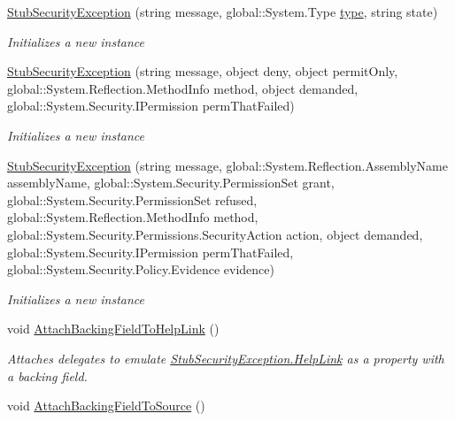 \begin{DoxyCompactItemize}
\hyperlink{class_system_1_1_security_1_1_fakes_1_1_stub_security_exception_a14219966c7775e4fcadc52aee919a311}{Stub\-Security\-Exception} (string message, global\-::\-System.\-Type \hyperlink{jquery-1_810_82-vsdoc_8js_a3940565e83a9bfd10d95ffd27536da91}{type}, string state)
\begin{DoxyCompactList}\small\item\em Initializes a new instance\end{DoxyCompactList}\item 
\hyperlink{class_system_1_1_security_1_1_fakes_1_1_stub_security_exception_adaeead1abee9dd06b0a7125549415ab9}{Stub\-Security\-Exception} (string message, object deny, object permit\-Only, global\-::\-System.\-Reflection.\-Method\-Info method, object demanded, global\-::\-System.\-Security.\-I\-Permission perm\-That\-Failed)
\begin{DoxyCompactList}\small\item\em Initializes a new instance\end{DoxyCompactList}\item 
\hyperlink{class_system_1_1_security_1_1_fakes_1_1_stub_security_exception_ab38e39877cafbd06cbf99647c3564cfc}{Stub\-Security\-Exception} (string message, global\-::\-System.\-Reflection.\-Assembly\-Name assembly\-Name, global\-::\-System.\-Security.\-Permission\-Set grant, global\-::\-System.\-Security.\-Permission\-Set refused, global\-::\-System.\-Reflection.\-Method\-Info method, global\-::\-System.\-Security.\-Permissions.\-Security\-Action action, object demanded, global\-::\-System.\-Security.\-I\-Permission perm\-That\-Failed, global\-::\-System.\-Security.\-Policy.\-Evidence evidence)
\begin{DoxyCompactList}\small\item\em Initializes a new instance\end{DoxyCompactList}\item 
void \hyperlink{class_system_1_1_security_1_1_fakes_1_1_stub_security_exception_ad994d840e66b4fa9ca30c504056e4ee1}{Attach\-Backing\-Field\-To\-Help\-Link} ()
\begin{DoxyCompactList}\small\item\em Attaches delegates to emulate \hyperlink{class_system_1_1_security_1_1_fakes_1_1_stub_security_exception_a61c1b37913c6c6cf65c369560cbe247a}{Stub\-Security\-Exception.\-Help\-Link} as a property with a backing field.\end{DoxyCompactList}\item 
void \hyperlink{class_system_1_1_security_1_1_fakes_1_1_stub_security_exception_a10e7ec8917df9c8701edcde811ccaa85}{Attach\-Backing\-Field\-To\-Source} ()

\end{DoxyCompactItemize}
